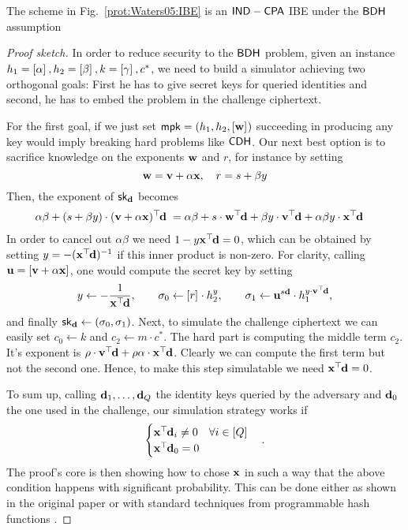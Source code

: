 \begin{proposition}
	The scheme in Fig.~\ref{prot:Waters05:IBE} is an $\mathsf{IND-CPA}$ IBE under the $\mathsf{BDH}$ assumption
\end{proposition}

\begin{proof}[Proof sketch]
	In order to reduce security to the $\mathsf{BDH}$ problem, given an instance $h_1 = \left[{\alpha}\right]_{}, h_2 = \left[{\beta}\right]_{}, k = \left[{\gamma}\right]_{}, c^\ast$, we need to build a simulator achieving two orthogonal goals:
	First he has to give secret keys for queried identities and second, he has to embed the problem in the challenge ciphertext.
	
	For the first goal, if we just set $\mathsf{mpk} = (h_1, h_2, \left[{\mathbf{w}}\right]_{})$ succeeding in producing any key would imply breaking hard problems like $\mathsf{CDH}$. Our next best option is to sacrifice knowledge on the exponents $\mathbf{w}$ and $r$, for instance by setting
	\[
		\mathbf{w} = \mathbf{v} + \alpha \mathbf{x},
			\quad
		r = s + \beta y
	\]
	Then, the exponent of $\mathsf{sk}_{\mathbf{d}}$ becomes
	\begin{align*}
		\alpha \beta + (s + \beta y) \cdot(\mathbf{v} + \alpha \mathbf{x})^\top\hspace{-.1em} \mathbf{d} 
			& \; =
		\alpha \beta 
			+ 
		s \cdot \mathbf{w}^\top\hspace{-.1em} \mathbf{d} 
			+ 
		\beta y \cdot \mathbf{v}^\top\hspace{-.1em} \mathbf{d} 
			+ 
		\alpha \beta y \cdot \mathbf{x}^\top\hspace{-.1em} \mathbf{d}
	\end{align*}
	In order to cancel out $\alpha \beta$ we need $1 - y \mathbf{x}^\top\hspace{-.1em} \mathbf{d} = 0$, which can be obtained by setting $y = -(\mathbf{x}^\top\hspace{-.1em} \mathbf{d})^{-1}$ if this inner product is non-zero.
	For clarity, calling $\mathbf{u} = \left[{\mathbf{v} + \alpha \mathbf{x}}\right]_{}$, one would compute the secret key by setting
	\[
		y \gets -\frac{1}{\mathbf{x}^\top\hspace{-.1em} \mathbf{d}}
			, \qquad
		\sigma_0 \gets \left[{r}\right]_{} \cdot h_2^{y}
			, \qquad
		\sigma_1 \gets 
			\mathbf{u}^{s \mathbf{d}}
				\cdot
			h_1^{y \cdot \mathbf{v}^\top\hspace{-.1em} \mathbf{d}},
	\]
	and finally $\mathsf{sk}_{\mathbf{d}} \gets (\sigma_0, \sigma_1)$. 
	Next, to simulate the challenge ciphertext we can easily set $c_0 \gets k$ and $c_2 \gets m \cdot c^\ast$.
	The hard part is computing the middle term $c_2$. 
	It's exponent is $\rho \cdot \mathbf{v}^\top\hspace{-.1em} \mathbf{d} + \rho \alpha \cdot \mathbf{x}^\top\hspace{-.1em} \mathbf{d}$.
	Clearly we can compute the first term but not the second one. Hence, to make this step simulatable we need $\mathbf{x}^\top\hspace{-.1em} \mathbf{d} = 0$.
	
	To sum up, calling $\mathbf{d}_1, \ldots, \mathbf{d}_Q$ the identity keys queried by the adversary and $\mathbf{d}_0$ the one used in the challenge, our simulation strategy works if
	\[
	\begin{cases}
		\mathbf{x}^\top\hspace{-.1em} \mathbf{d}_i \neq 0 \quad \forall i \in {[Q]}
			\\
		\mathbf{x}^\top\hspace{-.1em} \mathbf{d}_0 = 0
	\end{cases}
	.
	\]
	The proof's core is then showing how to chose $\mathbf{x}$ in such a way that the above condition happens with significant probability.
	This can be done either as shown in the original paper or with standard techniques from programmable hash functions \cite{C:HofKil08}.
\end{proof}
